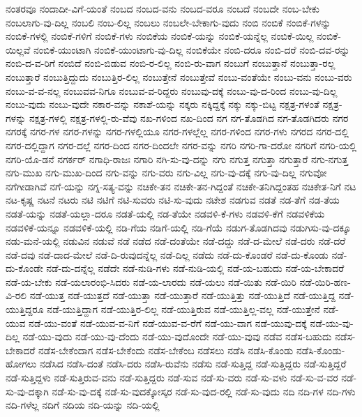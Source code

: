 {ನಂತರವೂ
ನಂದಾದೀ-ವಿಗೆ-ಯಂತೆ
ನಂಬದ
ನಂಬದ-ವನು
ನಂಬದ-ವರೂ
ನಂಬದೆ
ನಂಬದೇ
ನಂಬ-ಬೇಕು
ನಂಬಲಾಗು-ವು-ದಿಲ್ಲ
ನಂಬಲಿ
ನಂಬ-ಲಿಲ್ಲ
ನಂಬಲು
ನಂಬಲೇ-ಬೇಕಾಗು-ವುದು
ನಂಬಿ
ನಂಬಿಕೆ
ನಂಬಿಕೆ-ಗಳನ್ನು
ನಂಬಿಕೆ-ಗಳಲ್ಲಿ
ನಂಬಿಕೆ-ಗಳಿಗೆ
ನಂಬಿಕೆ-ಗಳು
ನಂಬಿಕೆಯ
ನಂಬಿಕೆ-ಯನ್ನು
ನಂಬಿಕೆ-ಯನ್ನೆಲ್ಲ
ನಂಬಿಕೆ-ಯಿಲ್ಲ
ನಂಬಿಕೆ-ಯಿಲ್ಲವೆ
ನಂಬಿಕೆ-ಯುಂಟಾಗಿ
ನಂಬಿಕೆ-ಯುಂಟಾಗು-ವು-ದಿಲ್ಲ
ನಂಬಿಕೆಯೇ
ನಂಬಿ-ದರೂ
ನಂಬಿ-ದರೆ
ನಂಬಿ-ದವ-ರನ್ನು
ನಂಬಿ-ದ-ವ-ರಿಗೆ
ನಂಬಿದೆ
ನಂಬಿ-ಬಿಡುವ
ನಂಬಿ-ರ-ಲಿಲ್ಲ
ನಂಬಿ-ರು-ವಾಗ
ನಂಬುಗೆ
ನಂಬುತ್ತಾನೆ
ನಂಬುತ್ತಾ-ರಲ್ಲ
ನಂಬುತ್ತಾರೆ
ನಂಬುತ್ತಿದ್ದುದು
ನಂಬುತ್ತಿರ-ಲಿಲ್ಲ
ನಂಬುತ್ತೇನೆ
ನಂಬುತ್ತೇವೆ
ನಂಬು-ವಂತೆಯೇ
ನಂಬು-ವನು
ನಂಬು-ವರು
ನಂಬು-ವ-ವ-ನಲ್ಲ
ನಂಬುವವ-ನಿಗೂ
ನಂಬುವ-ವ-ರಿದ್ದರು
ನಂಬುವು-ದಕ್ಕೆ
ನಂಬು-ವು-ದ-ರಿಂದ
ನಂಬು-ವು-ದಿಲ್ಲ
ನಂಬು-ವುದು
ನಂಬು-ವುದೇ
ನಕಾರ-ವನ್ನು
ನಕಾಶೆ-ಯನ್ನು
ನಕ್ಕರು
ನಕ್ಕಿದ್ದಕ್ಕೆ
ನಕ್ಕು
ನಕ್ಕು-ಬಿಟ್ಟ
ನಕ್ಷತ್ರ-ಗಳಂತೆ
ನಕ್ಷತ್ರ-ಗಳನ್ನು
ನಕ್ಷತ್ರ-ಗಳಲ್ಲಿ
ನಕ್ಷತ್ರ-ಗಳಲ್ಲಿ-ರು-ವೆವು
ನಖ-ಗಳಿಂದ
ನಖ-ದಿಂದ
ನಗ
ನಗ-ತೊಡಗಿದ
ನಗ-ತೊಡಗಿದರು
ನಗರ
ನಗರಕ್ಕೆ
ನಗರ-ಗಳ
ನಗರ-ಗಳನ್ನು
ನಗರ-ಗಳಲ್ಲಿಯೂ
ನಗರ-ಗಳಲ್ಲೆಲ್ಲ
ನಗರ-ಗಳಿಂದ
ನಗರ-ಗಳು
ನಗರದ
ನಗರ-ದಲ್ಲಿ
ನಗರ-ದಲ್ಲಿದ್ದಾಗ
ನಗರ-ದಲ್ಲೆ
ನಗರ-ದಿಂದ
ನಗರ-ದಿಂದಲೇ
ನಗರ-ವನ್ನು
ನಗರಿ
ನಗರಿ-ಗಾ-ದರೋ
ನಗರಿಗೆ
ನಗರಿ-ಯಲ್ಲಿ
ನಗರಿ-ಯೊ-ಡನೆ
ನಗರ್ಕರ್
ನಗಾಧಿ-ರಾಜಃ
ನಗಾರಿ
ನಗಿ-ಸು-ವು-ದನ್ನು
ನಗು
ನಗುತ್ತ
ನಗುತ್ತಾ
ನಗುತ್ತಾರೆ
ನಗು-ನಗುತ್ತ
ನಗು-ಮುಖ
ನಗು-ಮುಖ-ದಿಂದ
ನಗು-ವನ್ನು
ನಗು-ವರು
ನಗು-ವಿಲ್ಲ
ನಗು-ವು-ದಕ್ಕೆ
ನಗು-ವು-ದಿಲ್ಲ
ನಗುವೋ
ನಗೆಗೀಡಾಗಿವೆ
ನಗೆ-ಯನ್ನು
ನಗ್ನ-ಸತ್ಯ-ವನ್ನು
ನಚಿಕೇ-ತನ
ನಚಿಕೇ-ತನ-ಗಿದ್ದಂತೆ
ನಚಿಕೇ-ತನಿಗಿದ್ದಂತಹ
ನಚಿಕೇತ-ನಿಗೆ
ನಟ
ನಟ-ಕೃಷ್ಣ
ನಟನೆ
ನಟರು
ನಟಿ
ನಟಿಗೆ
ನಟಿ-ಸುವರು
ನಟಿ-ಸು-ವುದು
ನಟೇಶ
ನಡಗುವ
ನಡತೆ
ನಡ-ತೆಗೆ
ನಡ-ತೆಯ
ನಡತೆ-ಯನ್ನು
ನಡತೆ-ಯಲ್ಲಾ-ದರೂ
ನಡತೆ-ಯಲ್ಲಿ
ನಡ-ತೆಯೇ
ನಡವಳಿ-ಕೆ-ಗಳು
ನಡವಳಿ-ಕೆಗೆ
ನಡವಳಿಕೆಯ
ನಡವಳಿಕೆ-ಯನ್ನೂ
ನಡವಳಿಕೆ-ಯಲ್ಲಿ
ನಡಿ-ಗೆಯ
ನಡಿಗೆ-ಯಲ್ಲಿ
ನಡಿ-ಗೆಯೆ
ನಡುಗ-ತೊಡಗಿದವು
ನಡುಗಿಸು-ವು-ದಕ್ಕೂ
ನಡು-ಮನೆ-ಯಲ್ಲಿ
ನಡುವಿನ
ನಡುವೆ
ನಡೆ
ನಡೆದ
ನಡೆ-ದಂತೆಯೇ
ನಡೆ-ದದ್ದು
ನಡೆ-ದ-ಮೇಲೆ
ನಡೆ-ದರು
ನಡೆ-ದರೆ
ನಡೆ-ದವು
ನಡೆ-ದಾದ-ಮೇಲೆ
ನಡೆ-ದಿ-ರುವುದನ್ನೆಲ್ಲ
ನಡೆ-ದಿಲ್ಲ
ನಡೆದು
ನಡೆ-ದು-ಕೊಂಡರೆ
ನಡೆ-ದು-ಕೊಂಡು
ನಡೆ-ದು-ಕೊಂಡೇ
ನಡೆ-ದು-ದನ್ನೆಲ್ಲ
ನಡೆದೇ
ನಡೆ-ನುಡಿ-ಗಳು
ನಡೆ-ನುಡಿ-ಯಲ್ಲಿ
ನಡೆ-ಯ-ಬಹುದು
ನಡೆ-ಯ-ಬೇಕಾದರೆ
ನಡೆ-ಯ-ಬೇಕು
ನಡೆ-ಯಲಾರಂಭಿ-ಸಿದರು
ನಡೆ-ಯ-ಲಾರದು
ನಡೆ-ಯಲು
ನಡೆ-ಯಿತು
ನಡೆ-ಯಿರಿ
ನಡೆ-ಯಿರಿ-ಹಣ-ವಿ-ರಲಿ
ನಡೆ-ಯುತ್ತ
ನಡೆ-ಯುತ್ತದೆ
ನಡೆ-ಯುತ್ತಾ
ನಡೆ-ಯುತ್ತಾರೆ
ನಡೆ-ಯುತ್ತಿತ್ತು
ನಡೆ-ಯುತ್ತಿದೆ
ನಡೆ-ಯುತ್ತಿದ್ದ
ನಡೆ-ಯುತ್ತಿದ್ದರೂ
ನಡೆ-ಯುತ್ತಿದ್ದಾಗ
ನಡೆ-ಯುತ್ತಿರ-ಲಿಲ್ಲ
ನಡೆ-ಯುತ್ತಿರುವ
ನಡೆ-ಯುತ್ತಿಲ್ಲ-ವಲ್ಲ
ನಡೆ-ಯುತ್ತೇನೆ
ನಡೆ-ಯುವ
ನಡೆ-ಯು-ವಂತೆ
ನಡೆ-ಯುವ-ವ-ನಿಗೆ
ನಡೆ-ಯುವ-ವ-ರೆಗೆ
ನಡೆ-ಯು-ವಾಗ
ನಡೆ-ಯುವು-ದಕ್ಕೆ
ನಡೆ-ಯು-ವು-ದಿಲ್ಲ
ನಡೆ-ಯು-ವುದು
ನಡೆ-ಯು-ವು-ದೆಂದು
ನಡೆ-ಯು-ವುದೊಂದೇ
ನಡೆ-ಯು-ವುವು
ನಡೆವ
ನಡೆಸ-ಬಹುದು
ನಡೆಸ-ಬೇಕಾದರೆ
ನಡೆಸ-ಬೇಕೆಂದಾಗ
ನಡೆಸ-ಬೇಕೆಂದು
ನಡೆಸ-ಬೇಕೆಂಬ
ನಡೆಸಲು
ನಡೆಸಿ
ನಡೆಸಿ-ಕೊಂಡು
ನಡೆಸಿ-ಕೊಂಡು-ಹೋಗಲು
ನಡೆಸಿದ
ನಡೆಸಿ-ದಂತೆ
ನಡೆಸಿ-ದರು
ನಡೆಸಿ-ರುವೆನು
ನಡೆಸು
ನಡೆ-ಸುತ್ತಿದ್ದ
ನಡೆ-ಸುತ್ತಿದ್ದರು
ನಡೆ-ಸುತ್ತಿದ್ದರೆ
ನಡೆ-ಸುತ್ತಿದ್ದಳು
ನಡೆ-ಸುತ್ತಿರುವ-ವನು
ನಡೆ-ಸುತ್ತಿದ್ದರು
ನಡೆ-ಸುವ
ನಡೆ-ಸು-ವರು
ನಡೆ-ಸು-ವಳು
ನಡೆ-ಸು-ವ-ವರ
ನಡೆ-ಸು-ವು-ದಕ್ಕಾಗಿ
ನಡೆ-ಸು-ವು-ದಕ್ಕೆ
ನಡೆ-ಸು-ವುದಕ್ಕೋಸ್ಕರ
ನಡೆ-ಸು-ವುದ-ರಲ್ಲಿ
ನಡೆ-ಸು-ವುದು
ನದಿ
ನದಿ-ಗಳ
ನದಿ-ಗಳು
ನದಿ-ಗಳೆಲ್ಲ
ನದಿಗೆ
ನದಿಯ
ನದಿ-ಯನ್ನು
ನದಿ-ಯಲ್ಲಿ
}
